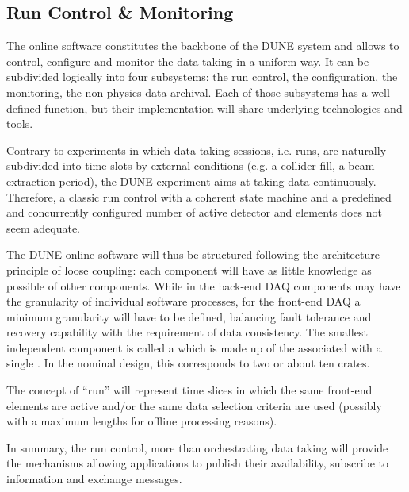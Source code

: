 
\subsection{Run Control \& Monitoring}
\label{sec:fd-daq-tcm}



The online software constitutes the backbone of the DUNE 
system and allows to control, configure and monitor the data taking in
a uniform way.
It can be subdivided logically into four subsystems: the run control,
the configuration, the monitoring, the non-physics data archival.
Each of those subsystems has a well defined function, but their
implementation will share underlying technologies and tools.

Contrary to experiments in which data taking sessions, i.e. runs, are
naturally subdivided into time slots by external conditions (e.g. a
collider fill, a beam extraction period), the DUNE experiment aims at
taking data continuously.
Therefore, a classic run control with a coherent state machine and a
predefined and concurrently configured number of active detector and
 elements does not seem adequate. 

The DUNE online software will thus be structured following the
architecture principle of loose coupling: each component will have as
little knowledge as possible of other components.
While in the back-end DAQ components may have the granularity of
individual software processes, for the front-end DAQ a minimum
granularity will have to be defined, balancing fault tolerance and
recovery capability with the requirement of data consistency.
The smallest independent component is called a  which
is made up of the  associated with a single
.
In the nominal design, this corresponds to two  
or about ten   crates.

The concept of ``run'' will represent time slices in which the same
front-end elements are active and/or the same data selection criteria
are used (possibly with a maximum lengths for offline processing
reasons). 

In summary, the run control, more than orchestrating data taking will
provide the mechanisms allowing  applications to publish
their availability, subscribe to information and exchange messages. 

